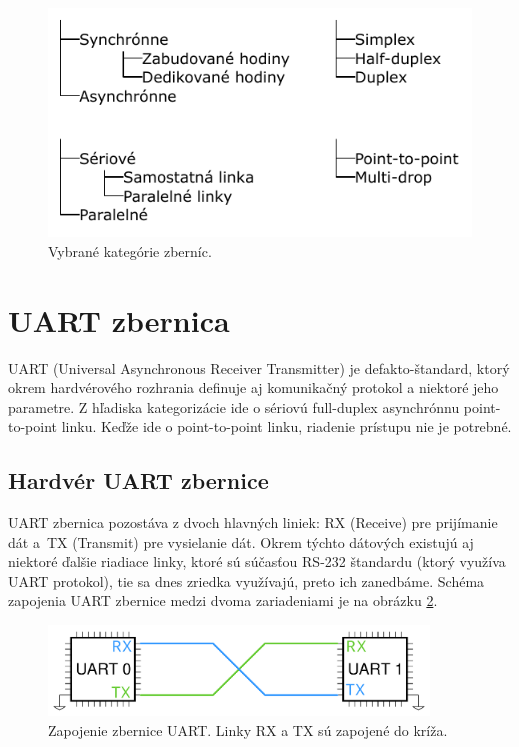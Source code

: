 \begin{figure}
    \centerline{\includegraphics[width=1\textwidth]{images/misc/busTree.pdf}}
    \caption[Vybrané kategórie zberníc]{Vybrané kategórie zberníc.}
    \label{obr:busTree}
\end{figure}

\section{UART zbernica}
UART (Universal Asynchronous Receiver Transmitter) je defakto-štandard, ktorý okrem hardvérového rozhrania definuje aj komunikačný protokol a niektoré jeho parametre. Z hľadiska kategorizácie ide o sériovú full-duplex asynchrónnu point-to-point linku. Keďže ide o point-to-point linku, riadenie prístupu nie je potrebné.

\subsection{Hardvér UART zbernice}
UART zbernica pozostáva z dvoch hlavných liniek: RX (Receive) pre prijímanie dát a~TX (Transmit) pre vysielanie dát. Okrem týchto dátových existujú aj niektoré ďalšie riadiace linky, ktoré sú súčasťou RS-232 štandardu \cite{rs232Spec} (ktorý využíva UART protokol), tie sa dnes zriedka využívajú, preto ich zanedbáme. Schéma zapojenia UART zbernice medzi dvoma zariadeniami je na obrázku \ref{obr:uartWiring}.

\begin{figure}
    \centerline{\includegraphics[width=0.9\textwidth]{images/busses/uartWiring.pdf}}
    \caption[Zapojenie zbernice UART]{Zapojenie zbernice UART. Linky RX a TX sú zapojené do kríža.}
    \label{obr:uartWiring}
\end{figure}


